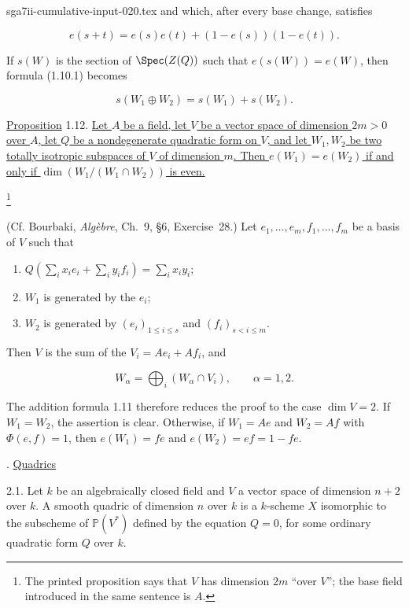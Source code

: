 \begin{filecontents*}{sga7ii-cumulative-input-020.tex}
and which, after every base change, satisfies

\begin{equation*}
e(s+t)=e(s)e(t)+(1-e(s))(1-e(t)).
\end{equation*}

If $s(W)$ is the section of $\Spec(Z(Q))$ such that $e(s(W))=e(W)$, then
formula (1.10.1) becomes

\begin{equation*}
s(W_1\oplus W_2)=s(W_1)+s(W_2).
\end{equation*}

\underline{Proposition} 1.12. \underline{Let $A$ be a field, let $V$ be
a vector space of dimension $2m>0$ over $A$, let $Q$ be a nondegenerate
quadratic form on $V$, and let $W_1,W_2$ be two totally isotropic
subspaces of $V$ of dimension $m$.  Then $e(W_1)=e(W_2)$ if and only if
$\dim(W_1/(W_1\cap W_2))$ is even.}

\footnote{The printed proposition says that $V$ has dimension $2m$ ``over
$V$''; the base field introduced in the same sentence is $A$.}


(Cf. Bourbaki, \emph{Algèbre}, Ch.~9, \S6, Exercise~28.)  Let
$e_1,\ldots,e_m,f_1,\ldots,f_m$ be a basis of $V$ such that

\begin{enumerate}[label=\alph*),leftmargin=2.5em]
\item $Q(\sum_i x_i e_i+\sum_i y_i f_i)=\sum_i x_i y_i$;
\item $W_1$ is generated by the $e_i$;
\item $W_2$ is generated by $(e_i)_{1\leq i\leq s}$ and
$(f_i)_{s<i\leq m}$.
\end{enumerate}

Then $V$ is the sum of the $V_i=Ae_i+Af_i$, and

\begin{equation*}
W_\alpha=\bigoplus_i(W_\alpha\cap V_i),
\qquad \alpha=1,2.
\end{equation*}

The addition formula 1.11 therefore reduces the proof to the case
$\dim V=2$.  If $W_1=W_2$, the assertion is clear.  Otherwise, if
$W_1=Ae$ and $W_2=Af$ with $\Phi(e,f)=1$, then
$e(W_1)=fe$ and $e(W_2)=ef=1-fe$.

. \underline{Quadrics}

2.1. Let $k$ be an algebraically closed field and $V$ a vector space of
dimension $n+2$ over $k$.  A smooth quadric of dimension $n$ over $k$ is
a $k$-scheme $X$ isomorphic to the subscheme of $\mathbb P(V^*)$ defined
by the equation $Q=0$, for some ordinary quadratic form $Q$ over $k$.


\end{filecontents*}
